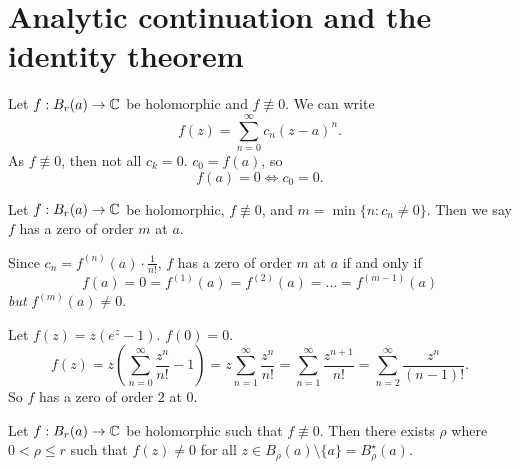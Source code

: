 \section{Analytic continuation and the identity theorem}

Let $f: B_r(a) \to \mathbb{C}$ be holomorphic and
$f \not\equiv 0$. 
We can write
\[
    f(z) = \sum^{\infty}_{n = 0} c_n(z-a)^n.
\]
As $f \not\equiv 0$, then not all $c_k = 0$.
$c_0 = f(a)$, so 
\[
    f(a) = 0 \iff c_0 = 0.
\]

\begin{definition}[]
    Let $f: B_r(a) \to \mathbb{C}$ be holomorphic, $f \not\equiv 0$,
    and $m = \min\{n : c_n \neq 0\}$.
    Then we say $f$ has a zero of order $m$ at $a$.
\end{definition}

\begin{remark}
    Since $c_n = f^{(n)}(a) \cdot \frac1{n!}$,
    $f$ has a zero of order $m$ at $a$ if and only if
    \[
        f(a) = 0 
        = f^{(1)}(a) 
        = f^{(2)}(a) 
        = \ldots
        = f^{(m-1)}(a)
    \]
    \emph{but} $f^{(m)}(a) \neq 0$.
\end{remark}

\begin{example}
    Let $f(z) = z(e^z - 1)$.
    $f(0) = 0$.
    \[
        f(z) = z
        \left(
            \sum^{\infty}_{n=0} \frac{z^n}{n!} - 1
        \right)
        = z \sum^{\infty}_{n = 1} \frac{z^n}{n!} 
        = \sum^{\infty}_{n=1} \frac{z^{n+1}}{n!} 
        = \sum^{\infty}_{n=2} \frac{z^n}{(n-1)!}.
    \]
    So $f$ has a zero of order $2$ at $0$.
\end{example}

\begin{theorem}
    Let $f:B_r(a) \to \mathbb{C}$ be holomorphic
    such that $f \not\equiv 0$.
    Then there exists $\rho$ where $0 < \rho \leq r$
    such that $f(z) \neq 0$ for all
    $z \in B_\rho(a) \setminus \{a\} = B^\star_\rho(a)$.
\end{theorem}

